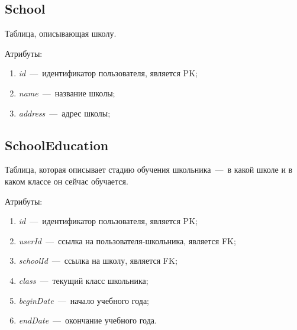 \documentclass[14pt]{article}
\begin{document}
\subsection{School}

Таблица, описывающая школу.

Атрибуты:
\begin{enumerate}
	\item \emph{id}~---~идентификатор пользователя, является PK; 
	\item \emph{name}~---~название школы;
	\item \emph{address}~---~адрес школы;
\end{enumerate}

\subsection{SchoolEducation}

Таблица, которая описывает стадию обучения школьника~---~в какой школе и в каком классе он сейчас обучается.

Атрибуты:
\begin{enumerate}
	\item \emph{id}~---~идентификатор пользователя, является PK; 
	\item \emph{userId}~---~ссылка на пользователя-школьника, является FK;
	\item \emph{schoolId}~---~ссылка на школу, является FK;
	\item \emph{class}~---~текущий класс школьника;
	\item \emph{beginDate}~---~начало учебного года;
	\item \emph{endDate}~---~окончание учебного года.
\end{enumerate}
\end{document}
